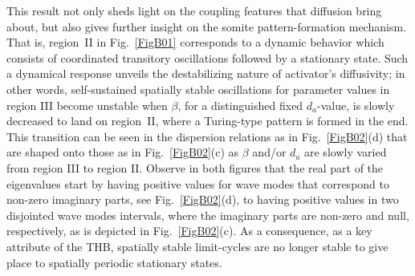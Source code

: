 \documentclass[%
 preprint,
 aip, 
 amsmath,amssymb,
]{revtex4-2}
\begin{document}
This result not only sheds light on the coupling features that diffusion bring about, but also gives further insight on the somite pattern-formation mechanism. That is, region~II in Fig.~\ref{FigB01} corresponds to a dynamic behavior which consists of coordinated transitory oscillations  followed by a stationary state. Such a dynamical response unveils the destabilizing nature of activator's diffusivity; in other words, self-sustained spatially stable oscillations for parameter values in region III become unstable when $\beta$, for a distinguished fixed $d_a$-value, is slowly decreased to land on region~II, where a Turing-type pattern is formed in the end. This transition can be seen in the dispersion relations as in Fig.~\ref{FigB02}(d) that are shaped onto those as in Fig.~\ref{FigB02}(c) as $\beta$ and/or $d_a$ are slowly varied from region III to region II. Observe in both figures that the real part of the eigenvalues start by having positive values for wave modes that correspond to non-zero imaginary parts, see Fig.~\ref{FigB02}(d), to having positive values in two disjointed wave modes intervals, where the imaginary parts are non-zero and null, respectively, as is depicted in Fig.~\ref{FigB02}(c). As a consequence, as a key attribute of the THB, spatially stable limit-cycles are no longer stable to give place to spatially periodic stationary states.
\end{document}
